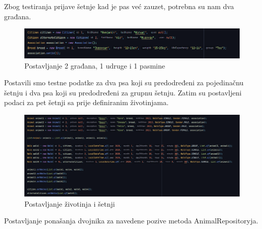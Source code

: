 	\eject

	\noindent Zbog testiranja prijave šetnje kad je pas već zauzet, potrebna su nam dva građana.

	\begin{figure}[H]
		\includegraphics[width=\linewidth]{slike/Testovi-3.png}
		\centering
		\caption{Postavljanje 2 građana, 1 udruge i 1 pasmine}
		\label{fig:testovi3}
	\end{figure}

	\noindent Postavili smo testne podatke za dva psa koji su predodređeni za pojedinačnu šetnju i dva psa koji su predodređeni za grupnu šetnju. Zatim su postavljeni podaci za pet šetnji sa prije definiranim životinjama.

	\begin{figure}[H]
		\includegraphics[width=\linewidth]{slike/Testovi-4.png}
		\centering
		\caption{Postavljanje životinja i šetnji}
		\label{fig:testovi4}
	\end{figure}
	
	\eject

	\noindent Postavljanje ponašanja dvojnika za navedene pozive metoda AnimalRepositoryja.

